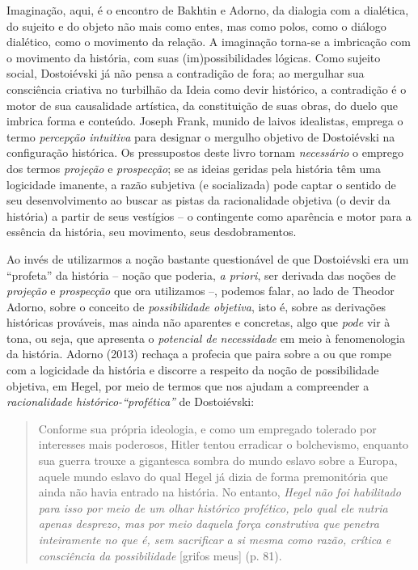 Imaginação, aqui, é o encontro de Bakhtin e Adorno, da dialogia com a
dialética, do sujeito e do objeto não mais como entes, mas como polos,
como o diálogo dialético, como o movimento da relação. A imaginação
torna-se a imbricação com o movimento da história, com suas
(im)possibilidades lógicas. Como sujeito social, Dostoiévski já não
pensa a contradição de fora; ao mergulhar sua consciência criativa no
turbilhão da Ideia como devir histórico, a contradição é o motor de sua
causalidade artística, da constituição de suas obras, do duelo que
imbrica forma e conteúdo. Joseph Frank, munido de laivos idealistas,
emprega o termo \emph{percepção intuitiva} para designar o mergulho
objetivo de Dostoiévski na configuração histórica. Os pressupostos deste
livro tornam \emph{necessário} o emprego dos termos \emph{projeção} e
\emph{prospecção}; se as ideias geridas pela história têm uma logicidade
imanente, a razão subjetiva (e socializada) pode captar o sentido de seu
desenvolvimento ao buscar as pistas da racionalidade objetiva (o devir
da história) a partir de seus vestígios -- o contingente como aparência
e motor para a essência da história, seu movimento, seus desdobramentos.

Ao invés de utilizarmos a noção bastante questionável de que Dostoiévski
era um ``profeta'' da história -- noção que poderia, \emph{a priori},
ser derivada das noções de \emph{projeção} e \emph{prospecção} que ora
utilizamos --, podemos falar, ao lado de Theodor Adorno, sobre o
conceito de \emph{possibilidade objetiva}, isto é, sobre as derivações
históricas prováveis, mas ainda não aparentes e concretas, algo que
\emph{pode} vir à tona, ou seja, que apresenta o \emph{potencial de}
\emph{necessidade} em meio à fenomenologia da história. Adorno (2013)
rechaça a profecia que paira sobre a ou que rompe com a logicidade da
história e discorre a respeito da noção de possibilidade objetiva, em
Hegel, por meio de termos que nos ajudam a compreender a
\emph{racionalidade histórico-``profética''} de Dostoiévski:

\begin{quote}
Conforme sua própria ideologia, e como um empregado tolerado por
interesses mais poderosos, Hitler tentou erradicar o bolchevismo,
enquanto sua guerra trouxe a gigantesca sombra do mundo eslavo sobre a
Europa, aquele mundo eslavo do qual Hegel já dizia de forma premonitória
que ainda não havia entrado na história. No entanto, \emph{Hegel não foi
habilitado para isso por meio de um olhar histórico profético, pelo qual
ele nutria apenas desprezo, mas por meio daquela força construtiva que
penetra inteiramente no que é, sem sacrificar a si mesma como razão,
crítica e consciência da possibilidade} {[}grifos meus{]} (p. 81).
\end{quote}

